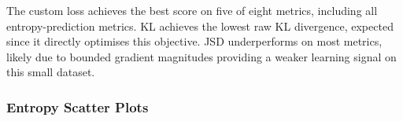 \documentclass[11pt,a4paper]{article}
\begin{document}
\usepackage{graphicx} %

\begin{table}[H]
\centering
\caption{Test-set evaluation metrics for each loss function.
Best result per column is \textbf{bolded}.}
\label{tab:results}

\end{table}

The custom loss achieves the best score on five of eight metrics, including
all entropy-prediction metrics.
KL achieves the lowest raw KL divergence, expected since it directly optimises
this objective.
JSD underperforms on most metrics, likely due to bounded gradient magnitudes
providing a weaker learning signal on this small dataset.

\subsubsection{Entropy Scatter Plots}
\end{document}

